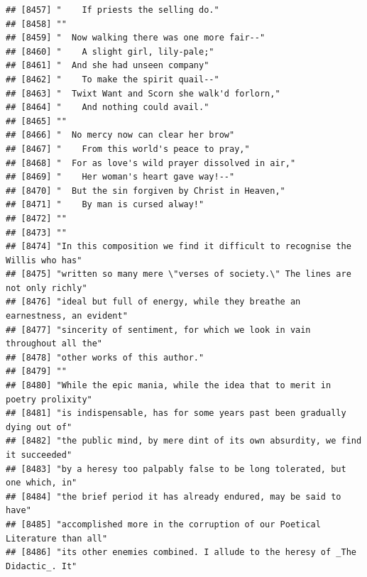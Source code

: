 \documentclass{article}\usepackage[]{graphicx}\usepackage[]{color}
\makeatletter
\newenvironment{kframe}{%
 \def\at@end@of@kframe{}%
 \ifinner\ifhmode%
  \def\at@end@of@kframe{\end{minipage}}%
  \begin{minipage}{\columnwidth}%
 \fi\fi%
 \def\FrameCommand##1{\hskip\@totalleftmargin \hskip-\fboxsep
 \colorbox{shadecolor}{##1}\hskip-\fboxsep
     \hskip-\linewidth \hskip-\@totalleftmargin \hskip\columnwidth}%
 \MakeFramed {\advance\hsize-\width
   \@totalleftmargin\z@ \linewidth\hsize
   \@setminipage}}%
 {\par\unskip\endMakeFramed%
 \at@end@of@kframe}
\newenvironment{knitrout}{}{} %
\makeatother
\begin{document}
\begin{knitrout}
\begin{kframe}
\begin{verbatim}
## [8457] "    If priests the selling do."                                              
## [8458] ""                                                                            
## [8459] "  Now walking there was one more fair--"                                     
## [8460] "    A slight girl, lily-pale;"                                               
## [8461] "  And she had unseen company"                                                
## [8462] "    To make the spirit quail--"                                              
## [8463] "  Twixt Want and Scorn she walk'd forlorn,"                                  
## [8464] "    And nothing could avail."                                                
## [8465] ""                                                                            
## [8466] "  No mercy now can clear her brow"                                           
## [8467] "    From this world's peace to pray,"                                        
## [8468] "  For as love's wild prayer dissolved in air,"                               
## [8469] "    Her woman's heart gave way!--"                                           
## [8470] "  But the sin forgiven by Christ in Heaven,"                                 
## [8471] "    By man is cursed alway!"                                                 
## [8472] ""                                                                            
## [8473] ""                                                                            
## [8474] "In this composition we find it difficult to recognise the Willis who has"    
## [8475] "written so many mere \"verses of society.\" The lines are not only richly"   
## [8476] "ideal but full of energy, while they breathe an earnestness, an evident"     
## [8477] "sincerity of sentiment, for which we look in vain throughout all the"        
## [8478] "other works of this author."                                                 
## [8479] ""                                                                            
## [8480] "While the epic mania, while the idea that to merit in poetry prolixity"      
## [8481] "is indispensable, has for some years past been gradually dying out of"       
## [8482] "the public mind, by mere dint of its own absurdity, we find it succeeded"    
## [8483] "by a heresy too palpably false to be long tolerated, but one which, in"      
## [8484] "the brief period it has already endured, may be said to have"                
## [8485] "accomplished more in the corruption of our Poetical Literature than all"     
## [8486] "its other enemies combined. I allude to the heresy of _The Didactic_. It"    

\end{verbatim}
\end{kframe}
\end{knitrout}
\end{document}
